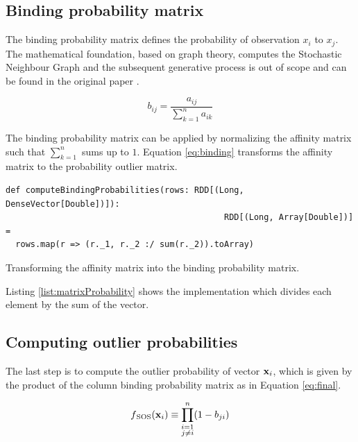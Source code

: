 \subsection{Binding probability matrix \label{subsec:bindingprob}}

The binding probability matrix defines the probability of observation $x_{i}$ to $x_{j}$. The mathematical foundation, based on graph theory, computes the Stochastic Neighbour Graph and the subsequent generative process is out of scope and can be found in the original paper \cite{MSU:CSE:00:2}.

\begin{equation}
b_{ij} = \frac{a_{ij}}{\sum_{k=1}^{n}a_{ik}}
\label{eq:binding}
\end{equation}

The binding probability matrix can be applied by normalizing the affinity matrix such that $\sum_{k=1}^{n}$ sums up to $1$. Equation \ref{eq:binding} transforms the affinity matrix to the probability outlier matrix.

\begin{listing}[ht!]
\begin{verbatim}
def computeBindingProbabilities(rows: RDD[(Long, DenseVector[Double])]): 
                                            RDD[(Long, Array[Double])] = 
  rows.map(r => (r._1, r._2 :/ sum(r._2)).toArray)
\end{verbatim}

\caption{Transforming the affinity matrix into the binding probability matrix.}
\label{list:matrixProbability}
\end{listing}

Listing \ref{list:matrixProbability} shows the implementation which divides each element by the sum of the vector.

\subsection{Computing outlier probabilities \label{subsec:outlierprobabilities}}

The last step is to compute the outlier probability of vector ${\bf x}_{i}$, which is given by the product of the column binding probability matrix as in Equation \ref{eq:final}.

\begin{equation}
f{_\text{SOS}}({\bf x}_{i}) \equiv \prod^{n}_{\substack{i=1\\j \neq i}}(1-b_{ji}) \label{eq:final}
\end{equation}

